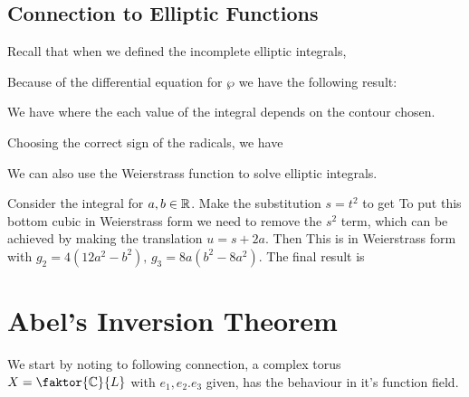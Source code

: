 \documentclass{article}
\begin{document}
\subsection{Connection to Elliptic Functions}

Recall that when we defined the incomplete elliptic integrals,

Because of the differential equation for $\wp$ we have the following result:

\begin{prop}
	We have 
	where the each value of the integral depends on the contour chosen. 
\end{prop}

\begin{example}
	Choosing the correct sign of the radicals, we have 
\end{example}

We can also use the Weierstrass function to solve elliptic integrals.

\begin{example}
	Consider the integral 
	for $a,b \in \mathbb{R}$. Make the substitution $s=t^2$ to get 
	To put this bottom cubic in Weierstrass form we need to remove the $s^2$ term, which can be achieved by making the translation $u = s+2a$. Then 
	This is in Weierstrass form with $g_2 = 4(12a^2-b^2), \, g_3 = 8a(b^2-8a^2)$. The final result is 
	
\end{example}

\section{Abel's Inversion Theorem}

We start by noting to following connection, a complex torus $X = \faktor{\mbb{C}}{L}$ with $e_1, e_2. e_3$ given, has the behaviour 
in it's function field. 




\end{document}
